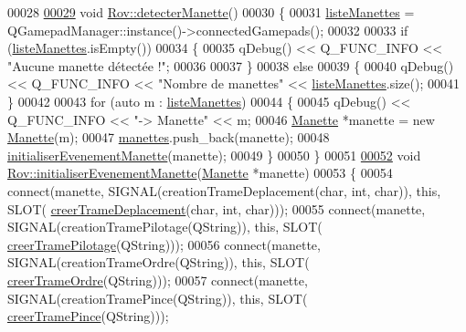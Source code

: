 \begin{DoxyCode}
00028 
\hyperlink{class_rov_a53979bc347cda7cc30d18324f2146be1}{00029} \textcolor{keywordtype}{void} \hyperlink{class_rov_a53979bc347cda7cc30d18324f2146be1}{Rov::detecterManette}()
00030 \{
00031     \hyperlink{class_rov_ac3bf6c7552073bd2d780e005205919a9}{listeManettes} = QGamepadManager::instance()->connectedGamepads();
00032 
00033     \textcolor{keywordflow}{if} (\hyperlink{class_rov_ac3bf6c7552073bd2d780e005205919a9}{listeManettes}.isEmpty())
00034     \{
00035         qDebug() << Q\_FUNC\_INFO << \textcolor{stringliteral}{"Aucune manette détectée !"};
00036 
00037     \}
00038     \textcolor{keywordflow}{else}
00039     \{
00040         qDebug() << Q\_FUNC\_INFO << \textcolor{stringliteral}{"Nombre de manettes"} << \hyperlink{class_rov_ac3bf6c7552073bd2d780e005205919a9}{listeManettes}.size();
00041     \}
00042 
00043     \textcolor{keywordflow}{for} (\textcolor{keyword}{auto} m : \hyperlink{class_rov_ac3bf6c7552073bd2d780e005205919a9}{listeManettes})
00044     \{
00045         qDebug() << Q\_FUNC\_INFO << \textcolor{stringliteral}{"-> Manette"} << m;
00046         \hyperlink{class_manette}{Manette} *manette = \textcolor{keyword}{new} \hyperlink{class_manette}{Manette}(m);
00047         \hyperlink{class_rov_a58ea20dc3615a732b87ac381bf1c0a83}{manettes}.push\_back(manette);
00048         \hyperlink{class_rov_a0d1863d7d230c0153253d7d2689429b5}{initialiserEvenementManette}(manette);
00049     \}
00050 \}
00051 
\hyperlink{class_rov_a0d1863d7d230c0153253d7d2689429b5}{00052} \textcolor{keywordtype}{void} \hyperlink{class_rov_a0d1863d7d230c0153253d7d2689429b5}{Rov::initialiserEvenementManette}(\hyperlink{class_manette}{Manette} *manette)
00053 \{
00054     connect(manette, SIGNAL(creationTrameDeplacement(\textcolor{keywordtype}{char}, \textcolor{keywordtype}{int}, \textcolor{keywordtype}{char})), \textcolor{keyword}{this}, SLOT(
      \hyperlink{class_rov_aa264d0723f6b491425ac2f85b933bab2}{creerTrameDeplacement}(\textcolor{keywordtype}{char}, \textcolor{keywordtype}{int}, \textcolor{keywordtype}{char})));
00055     connect(manette, SIGNAL(creationTramePilotage(QString)), \textcolor{keyword}{this}, SLOT(
      \hyperlink{class_rov_a97be62676ab0d57d5a8ac498147905ec}{creerTramePilotage}(QString)));
00056     connect(manette, SIGNAL(creationTrameOrdre(QString)), \textcolor{keyword}{this}, SLOT(
      \hyperlink{class_rov_a9e80eccfada890561e8af1f3426f6a2b}{creerTrameOrdre}(QString)));
00057     connect(manette, SIGNAL(creationTramePince(QString)), \textcolor{keyword}{this}, SLOT(
      \hyperlink{class_rov_a66be7f6ff6e20da160d55e0cd0605965}{creerTramePince}(QString)));

\end{DoxyCode}
